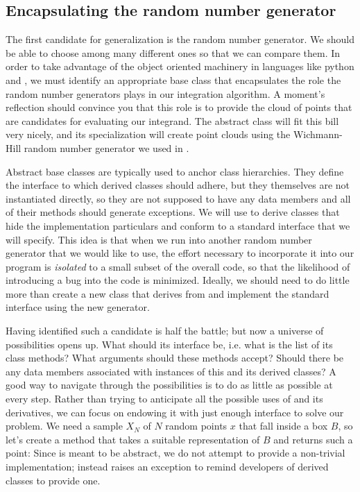 \subsection{Encapsulating the random number generator}
\label{sec:classes:pointcloud}

The first candidate for generalization is the random number generator. We should be able to
choose among many different ones so that we can compare them. In order to take advantage of the
object oriented machinery in languages like python and \cpp, we must identify an appropriate
base class that encapsulates the role the random number generators plays in our integration
algorithm. A moment's reflection should convince you that this role is to provide the cloud of
points that are candidates for evaluating our integrand. The abstract class 
will fit this bill very nicely, and its specialization  will create point
clouds using the Wichmann-Hill random number generator we used in . 

Abstract base classes are typically used to anchor class hierarchies. They define the interface
to which derived classes should adhere, but they themselves are not instantiated directly, so
they are not supposed to have any data members and all of their methods should generate
exceptions. We will use  to derive classes that hide the implementation
particulars and conform to a standard interface that we will specify.  This idea is that when
we run into another random number generator that we would like to use, the effort necessary to
incorporate it into our program is {\em isolated} to a small subset of the overall code, so
that the likelihood of introducing a bug into the code is minimized.  Ideally, we should need
to do little more than create a new class that derives from  and implement
the standard interface using the new generator.

Having identified such a candidate is half the battle; but now a universe of possibilities
opens up. What should its interface be, i.e. what is the list of its class methods? What
arguments should these methods accept? Should there be any data members associated with
instances of this and its derived classes? A good way to navigate through the possibilities is
to do as little as possible at every step. Rather than trying to anticipate all the possible
uses of  and its derivatives, we can focus on endowing it with just enough
interface to solve our problem. We need a sample $X_{N}$ of $N$ random points $x$ that fall inside
a box $B$, so let's create a method  that takes a suitable representation of $B$
and returns such a point:
%
%
Since  is meant to be abstract, we do not attempt to provide a non-trivial
implementation; instead  raises an exception to remind developers of derived
classes to provide one.


